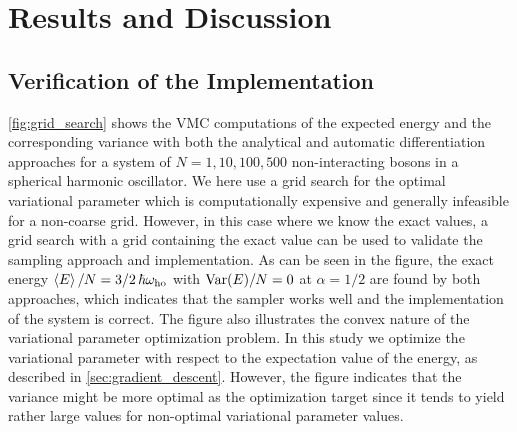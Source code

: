 \section{Results and Discussion}\label{sec:Results}

\subsection{Verification of the Implementation}\label{sec:project results}

\autoref{fig:grid_search} shows the VMC computations of the expected energy and the corresponding variance with both the analytical and automatic differentiation approaches for a system of $N=1, 10, 100, 500$ non-interacting bosons in a spherical harmonic oscillator. We here use a grid search for the optimal variational parameter which is computationally expensive and generally infeasible for a non-coarse grid. However, in this case where we know the exact values, a grid search with a grid containing the exact value can be used to validate the sampling approach and implementation. As can be seen in the figure, the exact energy $\expval{E}/N = 3/2 \, \hbar \omega_\mathrm{ho}$ with $\mathrm{Var} \qty(E) / N = 0$ at $\alpha=1/2$ are found by both approaches, which indicates that the sampler works well and the implementation of the system is correct. The figure also illustrates the convex nature of the variational parameter optimization problem. In this study we optimize the variational parameter with respect to the expectation value of the energy, as described in \autoref{sec:gradient_descent}. However, the figure indicates that the variance might be more optimal as the optimization target since it tends to yield rather large values for non-optimal variational parameter values. 


